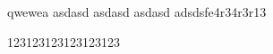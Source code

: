 \documentclass{article}
\begin{document}
qwewea
asdasd
asdasd
asdasd
adsdsfe4r34r3r13

123123123123123123
\end{document}
